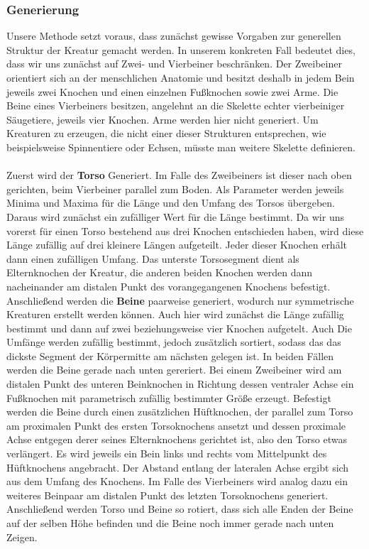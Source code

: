 \subsubsection{Generierung}
Unsere Methode setzt voraus, dass zunächst gewisse Vorgaben zur generellen Struktur der Kreatur gemacht werden. In unserem konkreten Fall bedeutet dies, dass wir uns zunächst auf Zwei- und Vierbeiner beschränken. Der Zweibeiner orientiert sich an der menschlichen Anatomie und besitzt deshalb in jedem Bein jeweils zwei Knochen und einen einzelnen Fußknochen sowie zwei Arme. Die Beine eines Vierbeiners besitzen, angelehnt an die Skelette echter vierbeiniger Säugetiere, jeweils vier Knochen. Arme werden hier nicht generiert. Um Kreaturen zu erzeugen, die nicht einer dieser Strukturen entsprechen, wie beispielsweise Spinnentiere oder Echsen, müsste man weitere Skelette definieren.\\
\\
Zuerst  wird der \textbf{Torso} Generiert. Im Falle des Zweibeiners ist dieser nach oben gerichten, beim Vierbeiner parallel zum Boden. Als Parameter werden jeweils Minima und Maxima für die Länge und den Umfang des Torsos übergeben. Daraus wird zunächst ein zufälliger Wert für die Länge bestimmt. Da wir uns vorerst für einen Torso bestehend aus drei Knochen entschieden haben, wird diese Länge zufällig auf drei kleinere Längen aufgeteilt. Jeder dieser Knochen erhält dann einen zufälligen Umfang. Das unterste Torsosegment dient als Elternknochen der Kreatur, die anderen beiden Knochen werden dann nacheinander am distalen Punkt des vorangegangenen Knochens befestigt.\\
Anschließend werden die \textbf{Beine} paarweise generiert, wodurch nur symmetrische Kreaturen erstellt werden können. Auch hier wird zunächst die Länge zufällig bestimmt und dann auf zwei beziehungsweise vier Knochen aufgetelt. Auch Die Umfänge werden zufällig bestimmt, jedoch zusätzlich sortiert, sodass das das dickste Segment der Körpermitte am nächsten gelegen ist. In beiden Fällen werden die Beine gerade nach unten gereriert. Bei einem Zweibeiner wird am distalen Punkt des unteren Beinknochen in Richtung dessen ventraler Achse ein Fußknochen mit parametrisch zufällig bestimmter Größe erzeugt. Befestigt werden die Beine durch einen zusätzlichen Hüftknochen, der parallel zum Torso am proximalen Punkt des ersten Torsoknochens ansetzt und dessen proximale Achse entgegen derer seines Elternknochens gerichtet ist, also den Torso etwas verlängert. Es wird jeweils ein Bein links und rechts vom Mittelpunkt des Hüftknochens angebracht. Der Abstand entlang der lateralen Achse ergibt sich aus dem Umfang des Knochens. Im Falle des Vierbeiners wird analog dazu ein weiteres Beinpaar am distalen Punkt des letzten Torsoknochens generiert. Anschließend werden Torso und Beine so rotiert, dass sich alle Enden der Beine auf der selben Höhe befinden und die Beine noch immer gerade nach unten Zeigen.\\
